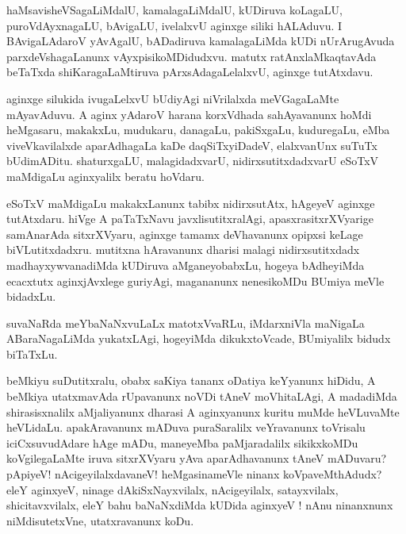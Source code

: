 \documentclass{article}
\begin{document}
\begin{mn}
haMsavisheVSagaLiMdalU, kamalagaLiMdalU, kUDiruva koLagaLU, puroVdAyxnagaLU, bAvigaLU, 
ivelalxvU aginxge siliki hALAduvu. I BAvigaLAdaroV yAvAgalU, bADadiruva kamalagaLiMda kUDi
nUrArugAvuda parxdeVshagaLanunx vAyxpisikoMDidudxvu. matutx ratAnxlaMkaqtavAda beTaTxda 
shiKaragaLaMtiruva pArxsAdagaLelalxvU, aginxge tutAtxdavu.
\end{mn}

\begin{mn}
aginxge silukida ivugaLelxvU bUdiyAgi niVrilalxda meVGagaLaMte mAyavAduvu. A aginx yAdaroV harana 
korxVdhada sahAyavanunx hoMdi heMgasaru, makakxLu, mudukaru, danagaLu,
pakiSxgaLu, kuduregaLu, eMba viveVkavilalxde aparAdhagaLa kaDe daqSiTxyiDadeV, elalxvanUnx suTuTx 
bUdimADitu. shaturxgaLU, malagidadxvarU, nidirxsutitxdadxvarU eSoTxV maMdigaLu aginxyalilx 
beratu hoVdaru.
\end{mn}

\begin{mn}
eSoTxV maMdigaLu makakxLanunx tabibx nidirxsutAtx, hAgeyeV aginxge tutAtxdaru. hiVge A paTaTxNavu
javxlisutitxralAgi, apasxrasitxrXVyarige samAnarAda sitxrXVyaru, aginxge tamamx deVhavanunx
opipxsi keLage biVLutitxdadxru. mutitxna hAravanunx dharisi malagi nidirxsutitxdadx 
madhayxywvanadiMda kUDiruva aMganeyobabxLu, hogeya bAdheyiMda ecacxtutx aginxjAvxlege guriyAgi, 
magananunx nenesikoMDu BUmiya meVle bidadxLu.
\end{mn}

\begin{mn}
suvaNaRda meYbaNaNxvuLaLx matotxVvaRLu, iMdarxniVla maNigaLa ABaraNagaLiMda yukatxLAgi, hogeyiMda 
dikukxtoVcade, BUmiyalilx bidudx biTaTxLu.
\end{mn}

\begin{mn}
beMkiyu suDutitxralu, obabx saKiya tananx oDatiya keYyanunx hiDidu, A beMkiya utatxmavAda
rUpavanunx noVDi tAneV moVhitaLAgi, A madadiMda shirasisxnalilx aMjaliyanunx dharasi A aginxyanunx
kuritu muMde heVLuvaMte heVLidaLu. apakAravanunx mADuva puraSaralilx veYravanunx toVrisalu 
iciCxsuvudAdare hAge mADu, maneyeMba paMjaradalilx sikikxkoMDu koVgilegaLaMte iruva sitxrXVyaru 
yAva aparAdhavanunx tAneV mADuvaru? pApiyeV! nAcigeyilalxdavaneV! heMgasinameVle ninanx 
koVpaveMthAdudx? eleY aginxyeV, ninage dAkiSxNayxvilalx, nAcigeyilalx, satayxvilalx, 
shicitavxvilalx, eleY bahu baNaNxdiMda kUDida aginxyeV ! nAnu ninanxnunx niMdisutetxVne, 
utatxravanunx koDu.
\end{mn}
\end{document}
